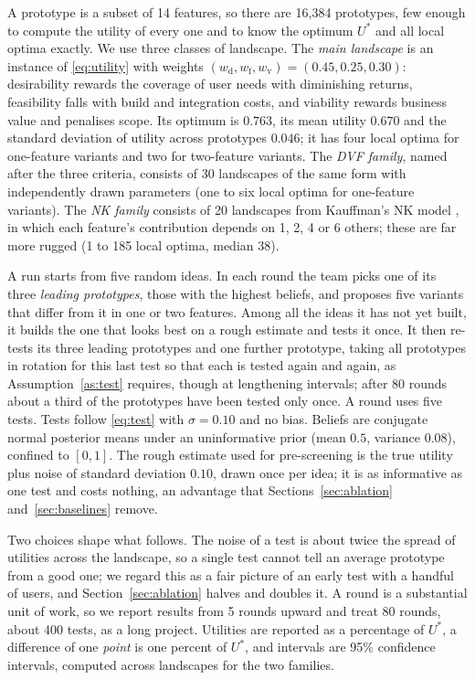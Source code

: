 \documentclass[preprint,review,11pt,authoryear]{elsarticle}
\theoremstyle{definition}
\begin{document}
A prototype is a subset of 14 features, so there are 16{,}384 prototypes, few enough to compute the utility of every one and to know the optimum $U^*$ and all local optima exactly. We use three classes of landscape. The \emph{main landscape} is an instance of \eqref{eq:utility} with weights $(w_{\mathrm d},w_{\mathrm f},w_{\mathrm v})=(0.45,0.25,0.30)$: desirability rewards the coverage of user needs with diminishing returns, feasibility falls with build and integration costs, and viability rewards business value and penalises scope. Its optimum is $0.763$, its mean utility $0.670$ and the standard deviation of utility across prototypes $0.046$; it has four local optima for one-feature variants and two for two-feature variants. The \emph{DVF family}, named after the three criteria, consists of 30 landscapes of the same form with independently drawn parameters (one to six local optima for one-feature variants). The \emph{NK family} consists of 20 landscapes from Kauffman's NK model \citep{kauffman1993}, in which each feature's contribution depends on 1, 2, 4 or 6 others; these are far more rugged (1 to 185 local optima, median 38).

A run starts from five random ideas. In each round the team picks one of its three \emph{leading prototypes}, those with the highest beliefs, and proposes five variants that differ from it in one or two features. Among all the ideas it has not yet built, it builds the one that looks best on a rough estimate and tests it once. It then re-tests its three leading prototypes and one further prototype, taking all prototypes in rotation for this last test so that each is tested again and again, as Assumption~\ref{as:test} requires, though at lengthening intervals; after 80 rounds about a third of the prototypes have been tested only once. A round uses five tests. Tests follow \eqref{eq:test} with $\sigma=0.10$ and no bias. Beliefs are conjugate normal posterior means under an uninformative prior (mean $0.5$, variance $0.08$), confined to $[0,1]$. The rough estimate used for pre-screening is the true utility plus noise of standard deviation $0.10$, drawn once per idea; it is as informative as one test and costs nothing, an advantage that Sections~\ref{sec:ablation} and~\ref{sec:baselines} remove.

Two choices shape what follows. The noise of a test is about twice the spread of utilities across the landscape, so a single test cannot tell an average prototype from a good one; we regard this as a fair picture of an early test with a handful of users, and Section~\ref{sec:ablation} halves and doubles it. A round is a substantial unit of work, so we report results from 5 rounds upward and treat 80 rounds, about 400 tests, as a long project. Utilities are reported as a percentage of $U^*$, a difference of one \emph{point} is one percent of $U^*$, and intervals are 95\% confidence intervals, computed across landscapes for the two families.
\end{document}
